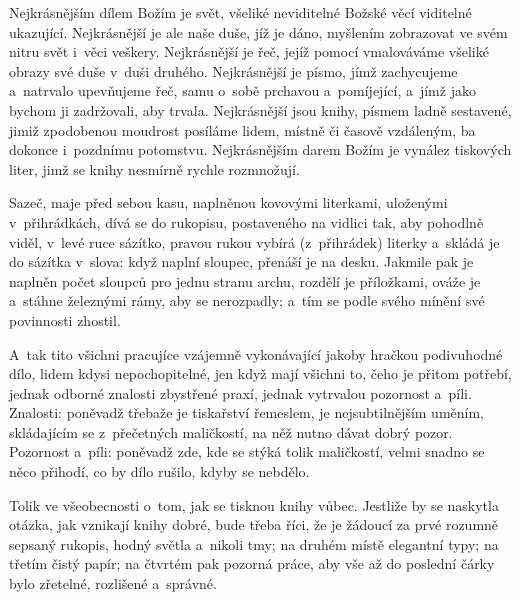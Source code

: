 Nejkrásnějším dílem Božím je svět, všeliké neviditelné Božské věcí viditelné
ukazující. Nejkrásnější je ale naše duše, jíž je dáno, myšlením zobrazovat
ve svém nitru svět i~věci veškery. Nejkrásnější je řeč, jejíž pomocí
vmalováváme všeliké obrazy své duše v~duši druhého. Nejkrásnější je písmo,
jímž zachycujeme a~natrvalo upevňujeme řeč, samu o~sobě prchavou
a~pomíjející, a~jímž jako bychom ji zadržovali, aby trvala. Nejkrásnější jsou
knihy, písmem ladně sestavené, jimiž zpodobenou moudrost posíláme lidem,
místně či časově vzdáleným, ba dokonce i~pozdnímu potomstvu. Nejkrásnějším
darem Božím je vynález tiskových liter, jimž se knihy nesmírně rychle
rozmnožují. 

Sazeč, maje před sebou kasu, naplněnou kovovými literkami, uloženými
v~přihrádkách, dívá se do rukopisu, postaveného na vidlici tak, aby pohodlně
viděl, v~levé ruce sázítko, pravou rukou vybírá (z~přihrádek) literky
a~skládá je do sázítka v~slova: když naplní sloupec, přenáší je na desku.
Jakmile pak je naplněn počet sloupců pro jednu stranu archu, rozdělí je
příložkami, ováže je a~stáhne železnými rámy, aby se nerozpadly; a~tím se
podle svého mínění své povinnosti zhostil.

A~tak tito všichni pracujíce vzájemně vykonávající jakoby hračkou
podivuhodné dílo, lidem kdysi nepochopitelné, jen když mají všichni to, čeho
je přitom potřebí, jednak odborné znalosti zbystřené praxí, jednak vytrvalou
pozornost a~píli. Znalosti: poněvadž třebaže je tiskařství řemeslem, je
nejsubtilnějším uměním, skládajícím se z~přečetných maličkostí, na něž nutno
dávat dobrý pozor. Pozornost a~píli: poněvadž zde, kde se stýká tolik
maličkostí, velmi snadno se něco přihodí, co by dílo rušilo, kdyby se
nebdělo.

Tolik ve všeobecnosti o~tom, jak se tisknou knihy vůbec. Jestliže by se
naskytla otázka, jak vznikají knihy dobré, bude třeba říci, že je žádoucí za
prvé rozumně sepsaný rukopis, hodný světla a~nikoli tmy; na druhém místě
elegantní typy; na třetím čistý papír; na čtvrtém pak pozorná práce, aby vše
až do poslední čárky bylo zřetelné, rozlišené a~správné.
